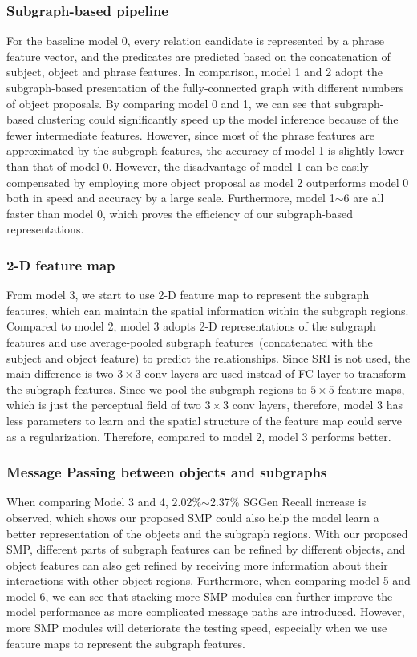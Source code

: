 \documentclass[runningheads]{llncs}
\begin{document}
\subsubsection{Subgraph-based pipeline}
For the baseline model 0, every relation candidate is represented by a phrase feature vector, and the predicates are predicted based on the concatenation of subject, object and phrase features. In comparison, model 1 and 2 adopt the subgraph-based presentation of the fully-connected graph with different numbers of object proposals. 
By comparing model 0 and 1, we can see that subgraph-based clustering could significantly speed up the model inference because of the fewer intermediate features. However, since most of the phrase features are approximated by the subgraph features, the accuracy of model 1 is slightly lower than that of model 0.
However, the disadvantage of model 1 can be easily compensated by employing more object proposal as model 2 outperforms model 0 both in speed and accuracy by a large scale. Furthermore, model 1$\sim$6 are all faster than model 0, which proves the efficiency of our subgraph-based representations. 


\subsubsection{2-D feature map}
From model 3, we start to use 2-D feature map to represent the subgraph features, which can maintain the spatial information within the subgraph regions. Compared to model 2, model 3 adopts 2-D representations of the subgraph features and use average-pooled subgraph features~(concatenated with the subject and object feature) to predict the relationships. Since SRI is not used, the main difference is two $3\times3$ conv layers are used instead of FC layer to transform the subgraph features. Since we pool the subgraph regions to $5\times 5$ feature maps, which is just the perceptual field of two $3\times3$ conv layers, therefore, model 3 has less parameters to learn and the spatial structure of the feature map could serve as a regularization. Therefore, compared to model 2, model 3 performs better. 

\subsubsection{Message Passing between objects and subgraphs} When comparing Model 3 and 4, 2.02\%$\sim$2.37\% SGGen Recall increase is observed, which shows our proposed SMP could also help the model learn a better representation of the objects and the subgraph regions. With our proposed SMP, different parts of subgraph features can be refined by different objects, and object features can also get refined by receiving more information about their interactions with other object regions. 
Furthermore, when comparing model 5 and model 6, we can see that stacking more SMP modules can further improve the model performance as more complicated message paths are introduced. However, more SMP modules will deteriorate the testing speed, especially when we use feature maps to represent the subgraph features. 
\end{document}
